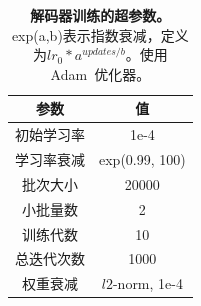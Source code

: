 \documentclass[9pt,twocolumn,twoside]{osajnl}
\begin{document}
\begin{table}
\centering
 \begin{tabular}{|c|c|}
\hline
 参数 & 值 \\ \hline
初始学习率 & 1e-4 \\ \hline
学习率衰减 & exp(0.99, 100) \\ \hline
 批次大小 & 20000 \\ \hline
 小批量数 & 2\\ \hline
 训练代数 & 10\\ \hline
 总迭代次数 & 1000\\ \hline
 权重衰减 & $l2$-norm, 1e-4 \\ \hline
\end{tabular}
\caption{\textbf{解码器训练的超参数。} exp(a,b)表示指数衰减，定义为$lr_0 * a^{updates/b}$。使用Adam~\cite{kingma2014adam}优化器。}
 \label{tab:hyperparametersdecoder}
\end{table}
\end{document}
